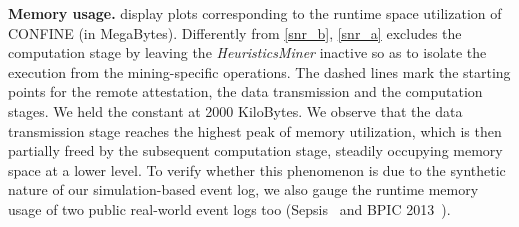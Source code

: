 \noindent\textbf{Memory usage.} \label{sec:evaluation:subsec:MemoryUsage} %
%
 display plots corresponding to the runtime space utilization of CONFINE (in MegaBytes). Differently from \cref{snr_b}, \cref{snr_a} excludes the computation stage by leaving the \emph{HeuristicsMiner} inactive so as to isolate the execution from the mining-specific operations. %
The dashed lines mark %
the starting points for the remote attestation, the data transmission and the computation stages. %
We held the {\SegSize} constant at \num{2000} KiloBytes. %
We observe that the data transmission stage reaches the highest peak of memory utilization, %
which is then partially freed by the subsequent computation stage, steadily occupying memory space at a lower level. %
To verify whether this phenomenon is due to the synthetic nature of our simulation-based event log, we also gauge the runtime memory usage of two public real-world event logs too (Sepsis~\cite{seps}
and BPIC 2013~\cite{bpic2013}).
